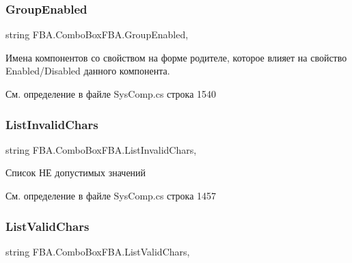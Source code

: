 \subsubsection{\texorpdfstring{Group\+Enabled}{GroupEnabled}}
{\footnotesize\ttfamily string F\+B\+A.\+Combo\+Box\+F\+B\+A.\+Group\+Enabled\hspace{0.3cm}{\ttfamily [get]}, {\ttfamily [set]}}



Имена компонентов со свойством на форме родителе, которое влияет на свойство Enabled/\+Disabled данного компонента. 



См. определение в файле Sys\+Comp.\+cs строка 1540

\mbox{\label{class_f_b_a_1_1_combo_box_f_b_a_a96646ca59ed6c150c9602cd469d2eae1}} 
\subsubsection{\texorpdfstring{List\+Invalid\+Chars}{ListInvalidChars}}
{\footnotesize\ttfamily string F\+B\+A.\+Combo\+Box\+F\+B\+A.\+List\+Invalid\+Chars\hspace{0.3cm}{\ttfamily [get]}, {\ttfamily [set]}}



Список НЕ допустимых значений 



См. определение в файле Sys\+Comp.\+cs строка 1457

\mbox{\label{class_f_b_a_1_1_combo_box_f_b_a_a43bf49ecd116617472f9813bfd3f92b3}} 
\subsubsection{\texorpdfstring{List\+Valid\+Chars}{ListValidChars}}
{\footnotesize\ttfamily string F\+B\+A.\+Combo\+Box\+F\+B\+A.\+List\+Valid\+Chars\hspace{0.3cm}{\ttfamily [get]}, {\ttfamily [set]}}



